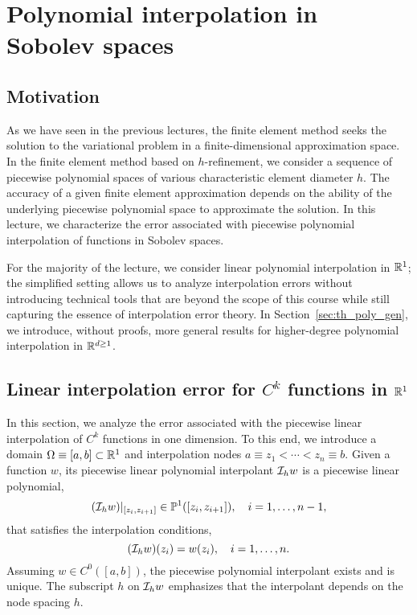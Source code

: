 \chapter{Polynomial interpolation in Sobolev spaces}

\section{Motivation}
As we have seen in the previous lectures, the finite element method seeks the solution to the variational problem in a finite-dimensional approximation space.  In the finite element method based on $h$-refinement, we consider a sequence of piecewise polynomial spaces of various characteristic element diameter $h$.  The accuracy of a given finite element approximation depends on the ability of the underlying piecewise polynomial space to approximate the solution.  In this lecture, we characterize the error associated with piecewise polynomial interpolation of functions in Sobolev spaces.

For the majority of the lecture, we consider linear polynomial interpolation in $\mathbb{R}^1$; the simplified setting allows us to analyze interpolation errors without introducing technical tools that are beyond the scope of this course while still capturing the essence of interpolation error theory. In Section~\ref{sec:th_poly_gen}, we introduce, without proofs, more general results for higher-degree polynomial interpolation in $\mathbb{R}^{d \geq 1}$.





\section{Linear interpolation error for $C^k$ functions in $\mathbb{R}^1$}

\label{sec:fe_interp_1d}
In this section, we analyze the error associated with the piecewise linear interpolation of $C^k$ functions in one dimension. To this end, we introduce a domain $\Omega \equiv [a,b] \subset \mathbb{R}^1$ and interpolation nodes $a \equiv z_1 < \cdots < z_n \equiv b$.  Given a function $w$, its piecewise linear polynomial interpolant $\mathcal{I}_h w$ is a piecewise linear polynomial,
\begin{equation*}
  (\mathcal{I}_h w)|_{[z_i,z_{i+1}]} \in \mathbb{P}^1([z_i,z_{i+1}]), \quad i = 1,\dots,n-1,
\end{equation*}
that satisfies the interpolation conditions,
\begin{equation*}
  (\mathcal{I}_h w)(z_i) = w(z_i), \quad i = 1,\dots,n.
\end{equation*}
Assuming $w \in C^0([a,b])$, the piecewise polynomial interpolant exists and is unique.  The subscript $h$ on $\mathcal{I}_h w$ emphasizes that the interpolant depends on the node spacing $h$.

